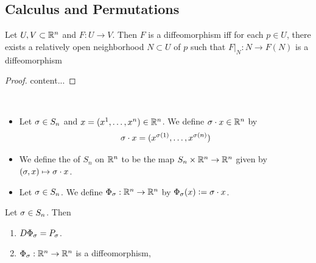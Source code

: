 \documentclass{book}
\begin{document}
	
	
	
	
	
	
	
	
	\subsection{Calculus and Permutations}
	
	\begin{ex} 
		Let $U,V \subset \mathbb{R}^n$ and $F: U \rightarrow V$. Then $F$ is a diffeomorphism iff for each $p \in U$, there exists a relatively open neighborhood $N \subset U$ of $p$ such that $F|_N:N \rightarrow F(N)$ is a diffeomorphism
	\end{ex}
	
	\begin{proof}
		content... 
	\end{proof}
	
	\begin{defn}  \
		\begin{itemize}
			\item Let $\sigma \in S_n$ and $x = (x^1, \ldots, x^n) \in \mathbb{R}^n$. We define $\sigma \cdot x \in \mathbb{R}^n$ by 
			$$\sigma \cdot x = (x^{\sigma(1)}, \ldots, x^{\sigma(n)})$$
			\item We define the  of $S_n$ on $\mathbb{R}^n$ to be the map $S_n \times \mathbb{R}^n \rightarrow \mathbb{R}^n$ given by $(\sigma, x) \mapsto \sigma \cdot x$.
			\item Let $\sigma \in S_n$. We define $\Phi_{\sigma}: \mathbb{R}^n \rightarrow \mathbb{R}^n$ by $\Phi_{\sigma}(x) \vcentcolon= \sigma \cdot x$. 
		\end{itemize}
	\end{defn}
	
	\begin{ex} 
		Let $\sigma \in S_n$. Then 
		\begin{enumerate}
			\item $D \Phi_{\sigma} = P_{\sigma}$. 
			\item $\Phi_{\sigma}:\mathbb{R}^n \rightarrow \mathbb{R}^n$ is a diffeomorphism, 
		\end{enumerate}
	\end{ex}
	
\end{document}
